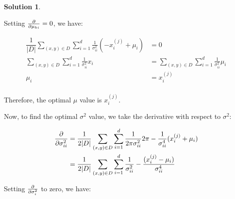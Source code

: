 \documentclass[letterpaper, 12pt]{article}
\theoremstyle{definition}
\newtheorem*{solution}{Solution}
\begin{document}
\begin{solution}
\begin{enumerate}[1.]
\begin{enumerate}[(a)]
Setting $\pdv{}{\mu_{ki}} = 0 $, we have:

\begin{equation*}
\begin{split}
\dfrac{1}{|D|}\sum_{(x,y) \in D} \sum_{i = 1}^{d} \frac{1}{\sigma_{ii} ^2}
		(- x_{i}^{(j)} + \mu_{i})  &= 0 \\
\sum_{(x,y) \in D} \sum_{i = 1}^{d} \frac{1}{\sigma_{ii} ^2}  x_{i} &=\sum_{(x,y) \in D} \sum_{i = 1}^{d} \frac{1}{\sigma_{ii} ^2} \mu_{i}   \\
\mu_{i} &=  x_{i}^{(j)} \\
\end{split}
\end{equation*}

Therefore, the optimal $\mu$ value is $x_{i}^{(j)}$.

Now, to find the optimal $\sigma^{2}$ value, we take the derivative with respect to $\sigma^{2}$:

 
 \begin{equation*}
 \begin{split}
 	\pdv{}{\sigma_{ii}^{2}} & = \dfrac{1}{2|D|} \sum_{(x,y) \in D} \sum_{i=1}^{d} \dfrac{1}{2\pi\sigma^{2}_{ii}}2\pi - \dfrac{1}{\sigma_{ii}^{4}}(x_{i}^{(j)} + \mu_{i})\\
    & = \dfrac{1}{2|D|} \sum_{(x,y) \in D} \sum_{i=1}^{d} \dfrac{1}{\sigma_{ii}^{2}} - \dfrac{(x_{i}^{(j)} - \mu_{i})}{\sigma_{ii}^{4}}
 \end{split}
 \end{equation*}
 
 Setting $\pdv{}{\sigma_{i} ^2}$ to zero, we have:


\end{enumerate}
\end{enumerate}
\end{solution}
\end{document}
